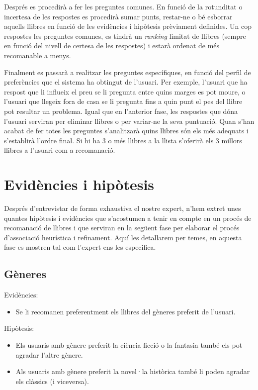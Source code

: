Després es procedirà a fer les preguntes comunes. En funció de la rotunditat o incertesa de les respostes es procedirà sumar punts, restar-ne o bé esborrar aquells llibres en funció de les evidències i hipòtesis prèviament definides. Un cop respostes les preguntes comunes, es tindrà un \emph{ranking} limitat de llibres (sempre en funció del nivell de certesa de les respostes) i estarà ordenat de més recomanable a menys.

Finalment es passarà a realitzar les preguntes específiques, en funció del perfil de preferències que el sistema ha obtingut de l'usuari. Per exemple, l'usuari que ha respost que li influeix el preu se li pregunta entre quins marges es pot moure, o l'usuari que llegeix fora de casa se li pregunta fins a quin punt el pes del llibre pot resultar un problema. Igual que en l'anterior fase, les respostes que dóna l'usuari serviran per eliminar llibres o per variar-ne la seva puntuació. Quan s'han acabat de fer totes les preguntes s'analitzarà quins llibres són els més adequats i s'establirà l'ordre final. Si hi ha 3 o més llibres a la llista s'oferirà els 3 millors llibres a l'usuari com a recomanació.


\section{Evidències i hipòtesis}

Després d'entrevistar de forma exhaustiva el nostre expert, n'hem extret unes quantes hipòtesis i evidències que s'acostumen a tenir en compte en un procés de recomanació de llibres i que serviran en la següent fase per elaborar el procés d'associació heurística i refinament. Aquí les detallarem per temes, en aquesta fase es mostren tal com l'expert ens les especifica.

\subsection{Gèneres}
Evidències:
\begin{itemize}
  \item Se li recomanen preferentment els llibres del gèneres preferit de l'usuari.
\end{itemize}
Hipòtesis:
\begin{itemize}
  \item Els usuaris amb gènere preferit la ciència ficció o la fantasia també els pot agradar l'altre gènere.
  \item Als usuaris amb gènere preferit la novel·la històrica també li poden agradar els clàssics (i viceversa).
\end{itemize}

